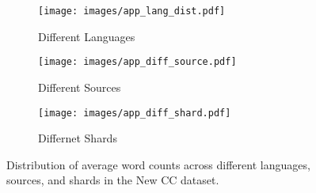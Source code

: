 \begin{figure*}[!thp]
\centering
\begin{subfigure}{0.33\textwidth}
    \texttt{[image: images/app\_lang\_dist.pdf]}
    \caption{Different Languages}
    \label{fig:diff_langs}
\end{subfigure}
\begin{subfigure}{0.33\textwidth}
    \texttt{[image: images/app\_diff\_source.pdf]}
    \caption{Different Sources}
    \label{fig:diff_sources}
\end{subfigure}
\begin{subfigure}{0.32\textwidth}
    \texttt{[image: images/app\_diff\_shard.pdf]}
    \caption{Differnet Shards}
    \label{fig:diff_shards}
\end{subfigure}
\caption{Distribution of average word counts across different languages, sources, and shards in the New CC dataset.}
\label{fig:pie_chart}
\end{figure*}
